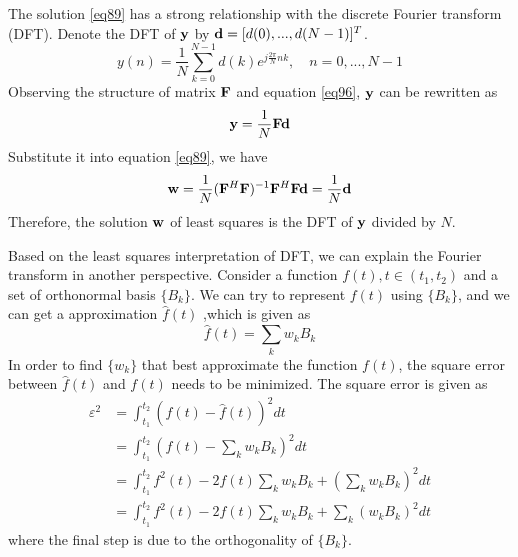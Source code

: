 \documentclass[10pt]{article}
\begin{document}
The solution \eqref{eq89} has a strong relationship with the discrete Fourier transform (DFT).
Denote the DFT of ${\bf{y}}$ by ${\bf{d}} = [d(0),...,d(N-1)]^T$. 
\begin{equation}
	y(n) = \frac{1}{N} \sum_{k=0}^{N-1} d(k) e^{ j \frac{2\pi}{N} n k }, \quad n=0,...,N-1 \label{eq96}
\end{equation}
Observing the structure of matrix ${\bf{F}}$ and equation \eqref{eq96}, ${\bf{y}}$ can be rewritten as
\begin{equation}
	{\bf{y}} = \frac{1}{N} {\bf{F}} {\bf{d}}
\end{equation}
Substitute it into equation \eqref{eq89}, we have
\begin{equation}
	{\bf{w}} = \frac{1}{N}( {\bf{F}}^H {\bf{F}} )^{-1} {\bf{F}}^H {\bf{F}} {\bf{d}} = \frac{1}{N}{\bf{d}}
\end{equation}
Therefore, the solution ${\bf{w}}$ of least squares is the DFT of ${\bf{y}}$ divided by $N$.

Based on the least squares interpretation of DFT, we can explain the Fourier transform in
another perspective. Consider a function $f(t), t \in(t_1,t_2)$ and a set of
orthonormal basis $\{B_k\}$. We can try to represent $f(t)$ using $\{B_k\}$, 
and we can get a approximation $\hat{f}(t)$ ,which is given as 
\begin{equation}
	\hat{f}(t) = \sum_k w_k B_k \label{basisRep}
\end{equation}
In order to find $\{w_k\}$ that best approximate the function $f(t)$, the 
square error between $\hat{f}(t)$ and $f(t)$ needs to be minimized. The square error is given as
\begin{align}
	\varepsilon^2 & = \int_{t_1}^{t_2} \left( f(t) - \hat{f}(t) \right)^2 dt \nonumber\\
	& = \int_{t_1}^{t_2} \left( f(t) - \sum_k w_k B_k \right)^2 dt \nonumber \\
	& = \int_{t_1}^{t_2} f^2(t) - 2 f(t) \sum_k w_k B_k + \left(\sum_k w_kB_k\right)^2 dt \nonumber \\
	& = \int_{t_1}^{t_2} f^2(t) - 2 f(t) \sum_k w_k B_k + \sum_k (w_kB_k)^2 dt
\end{align}
where the final step is due to the orthogonality of $\{B_k\}$.
\end{document}
